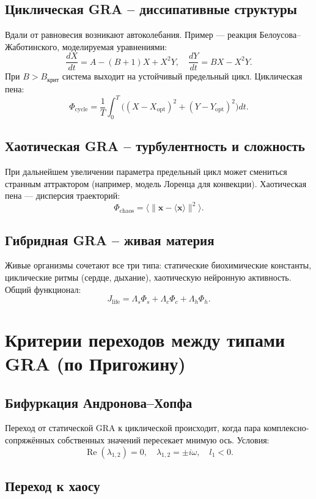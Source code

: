 \documentclass[12pt,a4paper]{article}
\begin{document}
\subsection{Циклическая GRA – диссипативные структуры}

Вдали от равновесия возникают автоколебания. Пример — реакция Белоусова–Жаботинского, моделируемая уравнениями:
\[
\frac{dX}{dt} = A - (B+1)X + X^2Y, \quad \frac{dY}{dt} = BX - X^2Y.
\]
При \(B > B_{\text{крит}}\) система выходит на устойчивый предельный цикл. Циклическая пена:
\[
\Phi_{\text{cycle}} = \frac{1}{T}\int_0^T \bigl( (X-X_{\text{opt}})^2 + (Y-Y_{\text{opt}})^2 \bigr) dt.
\]

\subsection{Хаотическая GRA – турбулентность и сложность}

При дальнейшем увеличении параметра предельный цикл может смениться странным аттрактором (например, модель Лоренца для конвекции). Хаотическая пена — дисперсия траекторий:
\[
\Phi_{\text{chaos}} = \langle \|\mathbf{x} - \langle \mathbf{x} \rangle\|^2 \rangle.
\]

\subsection{Гибридная GRA – живая материя}

Живые организмы сочетают все три типа: статические биохимические константы, циклические ритмы (сердце, дыхание), хаотическую нейронную активность. Общий функционал:
\[
J_{\text{life}} = \Lambda_s \Phi_s + \Lambda_c \Phi_c + \Lambda_h \Phi_h.
\]

\section{Критерии переходов между типами GRA (по Пригожину)}

\subsection{Бифуркация Андронова–Хопфа}

Переход от статической GRA к циклической происходит, когда пара комплексно-сопряжённых собственных значений пересекает мнимую ось. Условия:
\[
\operatorname{Re}(\lambda_{1,2}) = 0, \quad \lambda_{1,2} = \pm i\omega, \quad l_1 < 0.
\]

\subsection{Переход к хаосу}
\end{document}
